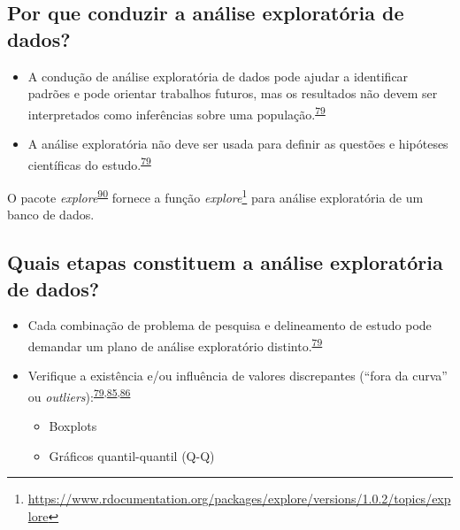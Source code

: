 \documentclass[
  a4paper,
]{book}
\renewcommand{\href}[2]{#2\footnote{\url{#1}}}
\newenvironment{infobox}[1]
  {
  \begin{itemize}
  \renewcommand{\labelitemi}{
    \raisebox{-.7\height}[0pt][0pt]{
      {\setkeys{Gin}{width=3em,keepaspectratio}
        \texttt{[image: \#1]}}
    }
  }
  \setlength{\fboxsep}{1em}
  \begin{blackbox}
  \item
  }
  {
  \end{blackbox}
  \end{itemize}
  }
\begin{document}
\hypertarget{por-que-conduzir-a-anuxe1lise-exploratuxf3ria-de-dados}{%
\subsection{Por que conduzir a análise exploratória de dados?}\label{por-que-conduzir-a-anuxe1lise-exploratuxf3ria-de-dados}}

\begin{itemize}
\item
  A condução de análise exploratória de dados pode ajudar a identificar padrões e pode orientar trabalhos futuros, mas os resultados não devem ser interpretados como inferências sobre uma população.\textsuperscript{\protect\hyperlink{ref-zuur2009}{79}}
\item
  A análise exploratória não deve ser usada para definir as questões e hipóteses científicas do estudo.\textsuperscript{\protect\hyperlink{ref-zuur2009}{79}}
\end{itemize}

\begin{infobox}{images/Rlogo}
O pacote \emph{explore}\textsuperscript{\protect\hyperlink{ref-explore}{90}} fornece a função \href{https://www.rdocumentation.org/packages/explore/versions/1.0.2/topics/explore}{\emph{explore}} para análise exploratória de um banco de dados.

\end{infobox}

\hypertarget{quais-etapas-constituem-a-anuxe1lise-exploratuxf3ria-de-dados}{%
\subsection{Quais etapas constituem a análise exploratória de dados?}\label{quais-etapas-constituem-a-anuxe1lise-exploratuxf3ria-de-dados}}

\begin{itemize}
\item
  Cada combinação de problema de pesquisa e delineamento de estudo pode demandar um plano de análise exploratório distinto.\textsuperscript{\protect\hyperlink{ref-zuur2009}{79}}
\item
  Verifique a existência e/ou influência de valores discrepantes (``fora da curva'' ou \emph{outliers}):\textsuperscript{\protect\hyperlink{ref-zuur2009}{79},\protect\hyperlink{ref-chatfield1986}{85},\protect\hyperlink{ref-Ferketich1986}{86}}

  \begin{itemize}
  \item
    Boxplots
  \item
    Gráficos quantil-quantil (Q-Q)
  \end{itemize}
\end{itemize}
\end{document}
